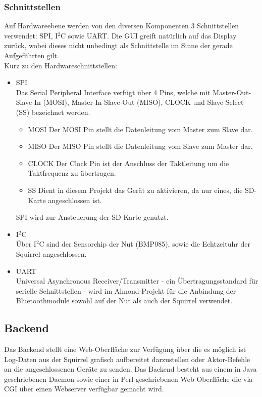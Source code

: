 \documentclass[12pt,a4paper]{article}
\begin{document}
\subsubsection{Schnittstellen}
Auf Hardwareebene werden von den diversen Komponenten 3 Schnittstellen verwendet: SPI, I$^2$C sowie UART. Die GUI greift natürlich auf das Display zurück, wobei dieses nicht unbedingt als Schnittstelle im Sinne der gerade Aufgeführten gilt.\\
Kurz zu den Hardwareschnittstellen:
\begin{itemize}
	\item SPI\\
	Das Serial Peripheral Interface verfügt über 4 Pins, welche mit Master-Out-Slave-In (MOSI), Master-In-Slave-Out (MISO), CLOCK und Slave-Select (SS) bezeichnet werden.
	\begin{itemize}
	\item MOSI
	Der MOSI Pin stellt die Datenleitung vom Master zum Slave dar.
	\item MISO
	Der MISO Pin stellt die Datenleitung vom Slave zum Master dar.
	\item CLOCK
	Der Clock Pin ist der Anschluss der Taktleitung um die Taktfrequenz zu übertragen.
	\item SS
	Dient in diesem Projekt das Gerät zu aktivieren, da nur eines, die SD-Karte angeschlossen ist.
	\end{itemize}
	SPI wird zur Ansteuerung der SD-Karte genutzt.
	\item I$^2$C\\
	Über I$^2$C sind der Sensorchip der Nut (BMP085), sowie die Echtzeituhr der Squirrel angeschlossen.
	\item UART\\
	Universal Asynchronous Receiver/Transmitter - ein Übertragungsstandard für serielle Schnittstellen - wird im Almond-Projekt für die Anbindung der Bluetoothmodule sowohl auf der Nut als auch der Squirrel verwendet.
\end{itemize}
\subsection{Backend}
Das Backend stellt eine Web-Oberfläche zur Verfügung über die es möglich ist Log-Daten aus der Squirrel grafisch aufbereitet darzustellen oder Aktor-Befehle an die angeschlossenen Geräte zu senden. Das Backend besteht aus einem in Java geschriebenen Daemon sowie einer in Perl geschriebenen Web-Oberfläche die via CGI über einen Webserver verfügbar gemacht wird.
\end{document}
